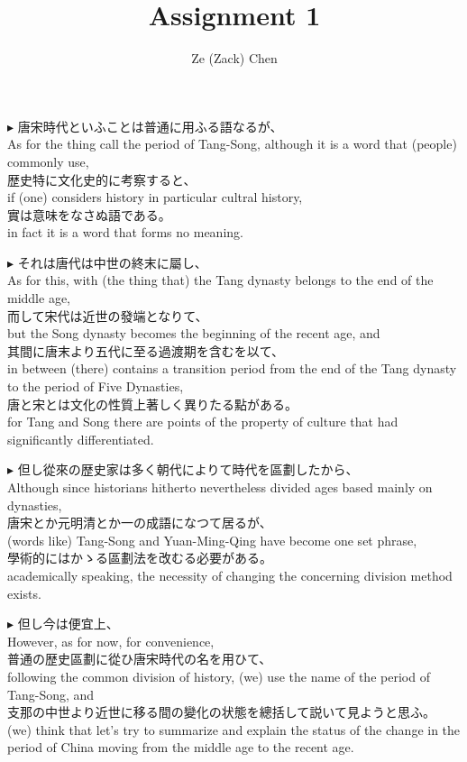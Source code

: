 \documentclass{ctexart}
\title{Assignment 1}
\author{Ze (Zack) Chen}
\makeatletter
\newcommand*{\shifttext}[1]{%
  \settowidth{\@tempdima}{#1}%
  \hspace{-\@tempdima}#1%
}
\newcommand{\plabel}[1]{%
\shifttext{\textbf{#1}\quad}%
}
\makeatother
\begin{document}
\maketitle

\plabel{$\blacktriangleright$}%
唐宋時代といふことは普通に用ふる語なるが、\\
As for the thing call the period of Tang-Song, although it is a word that (people) commonly use, \\
歴史特に文化史的に考察すると、\\
if (one) considers history in particular cultral history, \\
實は意味をなさぬ語である。\\
in fact it is a word that forms no meaning.

\vspace{1em}
\plabel{$\blacktriangleright$}%
それは唐代は中世の終末に屬し、\\
As for this, with (the thing that) the Tang dynasty belongs to the end of the middle age, \\
而して宋代は近世の發端となりて、\\
but the Song dynasty becomes the beginning of the recent age, and \\
其間に唐末より五代に至る過渡期を含むを以て、\\
in between (there) contains a transition period from the end of the Tang dynasty to the period of Five Dynasties, \\
唐と宋とは文化の性質上著しく異りたる點がある。\\
for Tang and Song there are points of the property of culture that had significantly differentiated.

\vspace{1em}
\plabel{$\blacktriangleright$}%
但し從來の歴史家は多く朝代によりて時代を區劃したから、\\
Although since historians hitherto nevertheless divided ages based mainly on dynasties,\\
唐宋とか元明清とか一の成語になつて居るが、\\
(words like) Tang-Song and Yuan-Ming-Qing have become one set phrase,\\
學術的にはかゝる區劃法を改むる必要がある。\\
academically speaking, the necessity of changing the concerning division method exists.

\vspace{1em}
\plabel{$\blacktriangleright$}%
但し今は便宜上、\\
However, as for now, for convenience,\\
普通の歴史區劃に從ひ唐宋時代の名を用ひて、\\
following the common division of history, (we) use the name of the period of Tang-Song, and\\
支那の中世より近世に移る間の變化の状態を總括して説いて見ようと思ふ。\\
(we) think that let's try to summarize and explain the status of the change in the period of China moving from the middle age to the recent age.
\end{document}
